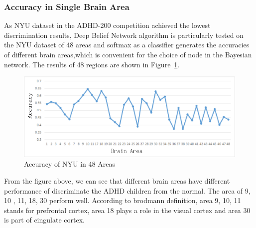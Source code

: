\documentclass[10pt,twocolumn,letterpaper]{article}
\begin{document}
\subsubsection{Accuracy in Single Brain Area}
As NYU dataset in the ADHD-200 competition achieved the lowest discrimination results, Deep Belief Network algorithm is particularly tested on the NYU dataset of 48 areas and softmax as a classifier generates the accuracies of different brain areas,which is convenient for the choice of node in the Bayesian network. The results of 48 regions are shown in Figure~\ref{fig:NYU}.
\begin{figure}[ht]
\begin{center}
   \includegraphics[width=0.9\linewidth]{NYU.png}
\end{center}
   \caption{Accuracy of NYU in 48 Areas}
\label{fig:NYU}
\end{figure}


From the figure above, we can see that different brain areas have different performance of discriminate the ADHD children from the normal. The area of 9, 10 , 11, 18, 30 perform well. According to brodmann definition, area 9, 10, 11 stands for prefrontal cortex, area 18 plays a role in the visual cortex and area 30 is part of cingulate cortex.
\end{document}
